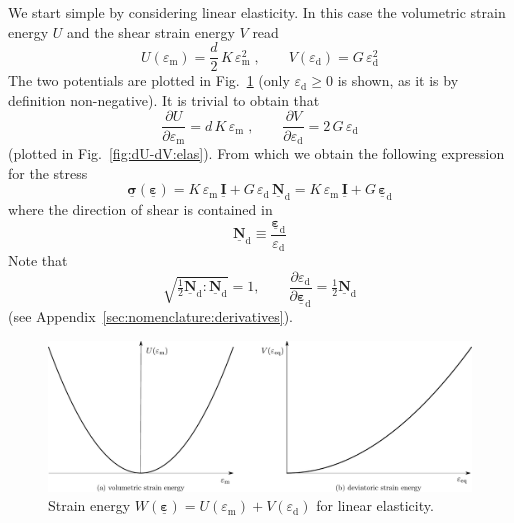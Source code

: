 \documentclass[times,namecite]{goose-article}
\newcommand\T[1]{\underline{\bm{{#1}}}}
\begin{document}
We start simple by considering linear elasticity. In this case the volumetric strain energy $U$ and the shear strain energy $V$ read
\begin{equation}\label{eq:W:elas}
  U ( \varepsilon_\mathrm{m}  ) = \frac{d}{2} \, K \, \varepsilon_\mathrm{m}^2
  \;, \qquad
  V ( \varepsilon_\mathrm{d} ) = G \, \varepsilon_\mathrm{d}^2
\end{equation}
The two potentials are plotted in Fig.~\ref{fig:U-V:elas} (only $\varepsilon_\mathrm{d} \geq 0$ is shown, as it is by definition non-negative). It is trivial to obtain that
\begin{equation}
  \frac{\partial U}{\partial \varepsilon_\mathrm{m}}
  =
  d \, K \, \varepsilon_\mathrm{m}
  \;, \qquad
  \frac{\partial V}{\partial \varepsilon_\mathrm{d}}
  =
  2 \, G \, \varepsilon_\mathrm{d}
\end{equation}
(plotted in Fig.~\ref{fig:dU-dV:elas}). From which we obtain the following expression for the stress
\begin{equation}\label{eq:sig-elas}
  \T{\sigma} ( \T{\varepsilon} )
  =
  K \, \varepsilon_\mathrm{m} \, \T{I}
  +
  G \, \varepsilon_\mathrm{d} \, \T{N}_\mathrm{d}
  =
  K \, \varepsilon_\mathrm{m} \, \T{I}
  +
  G \, \T{\varepsilon}_\mathrm{d}
\end{equation}
where the direction of shear is contained in
\begin{equation}
  \T{N}_\mathrm{d} \equiv \frac{\T{\varepsilon}_\mathrm{d}}{\varepsilon_\mathrm{d}}
\end{equation}
Note that
\begin{equation}
  \sqrt{ \tfrac{1}{2} \T{N}_\mathrm{d} : \T{N}_\mathrm{d} } = 1,
  \qquad
  \frac{\partial \varepsilon_\mathrm{d}}{\partial \T{\varepsilon}_\mathrm{d}} = \tfrac{1}{2} \T{N}_\mathrm{d}
\end{equation}
(see Appendix~\ref{sec:nomenclature:derivatives}).

\begin{figure}[htp]
  \centering
  \includegraphics[width=1.\textwidth]{figures/potential_U-V_elas}
  \caption{Strain energy $W ( \T{\varepsilon} ) = U ( \varepsilon_\mathrm{m} ) + V ( \varepsilon_\mathrm{d} )$ for linear elasticity.}
  \label{fig:U-V:elas}
\end{figure}
\end{document}
